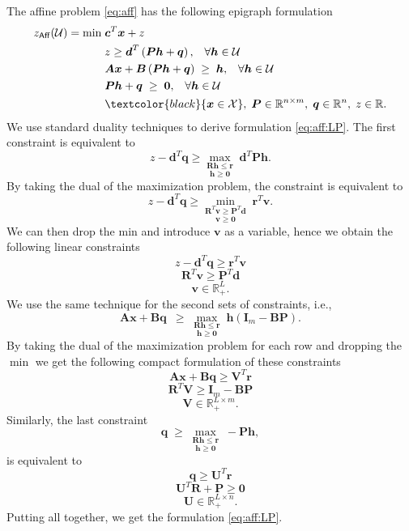 \documentclass[moor]{informs1}              %
\newcommand{\mb}[1]{\ensuremath{\boldsymbol{#1}}}
\newcommand*{\red}{\textcolor{black}}
\begin{document}
\begin{APPENDICES}
The affine problem \eqref{eq:aff} has the following epigraph formulation
 \begin{equation*}
\begin{aligned}
z_{\sf Aff}({\cal U}) = \min \; & \mb{c}^T \mb{x} + z\\
& z \geq   \mb{d}^T\left( \mb{P}\mb{h}+\mb{q}\right),  \; \; \; \forall \mb h \in {\cal U} \\
& \mb{A}\mb{x} + \mb{B}\left( \mb{P}\mb{h}+\mb{q}\right) \; \geq \; \mb{h},   \; \; \; \forall \mb h \in {\cal U} \\
& \mb{P}\mb{h}+\mb{q} \; \geq \; \mb{0},   \; \; \; \forall \mb h \in {\cal U} \\
& \red{\mb{x}  \in  {\cal X} }, \; \mb P \in \mathbb{R}^{n \times m}, \; \mb q \in \mathbb{R}^n, \; z \in \mathbb{R}.   \\
\end{aligned}
\end{equation*}
We use standard duality techniques to derive formulation \eqref{eq:aff:LP}. The first constraint is equivalent to 
$$ z - \mb d^T \mb q \geq \underset {\mb h \geq \mb 0 }{\underset{  \mb R  \mb h \leq \mb r  }\max } \; \mb{d}^T\mb{P}\mb{h} .$$
By taking the dual of the maximization problem, the constraint is equivalent to
$$ z - \mb d^T \mb q \geq \underset {\mb v \geq \mb 0 }{\underset{   \mb R^T \mb v \geq \mb P^T \mb d  }\min } \;      \mb{r}^T\mb v .$$
We can then drop the min and introduce $\mb v $ as a variable, hence we obtain the following linear constraints
$$ z- \mb d^T \mb q \geq \mb r^T \mb v $$
$$ \mb R^T \mb v \geq \mb P^T \mb d $$
$$ \mb{v}   \in  {\mathbb R}^{L}_+.$$
We use the same technique for the second sets of constraints, i.e.,
$$ \mb{A}\mb{x} + \mb{B}   \mb q   \ \; \geq \;    \underset {\mb h \geq \mb 0 }{\underset{  \mb R  \mb h \leq \mb r  }\max } \;         \mb{h} (  \mb I_m - \mb B \mb P )  .$$
By taking the dual of the maximization problem for each row and dropping the $\min$ we get the following compact formulation of these constraints
$$ \mb A \mb x + \mb B \mb q \geq \mb V^T \mb r $$
$$ \mb R^T \mb V \geq \mb I_m - \mb B \mb P $$
$$  \mb{V}   \in  {\mathbb R}^{L \times m}_+ .$$
Similarly, the last constraint 
$$ \mb{q} \; \geq \;\underset {\mb h \geq \mb 0 }{\underset{  \mb R  \mb h \leq \mb r  }\max } \;      -\mb{P}\mb{h} ,  $$
is equivalent to 
$$ \mb q \geq \mb U^T \mb r $$
$$ \mb U^T \mb R + \mb P \geq \mb 0 $$
$$\mb{U}   \in  {\mathbb R}^{L \times n}_+ . $$
Putting all together, we get the formulation  \eqref{eq:aff:LP}.




\end{APPENDICES}
\end{document}
